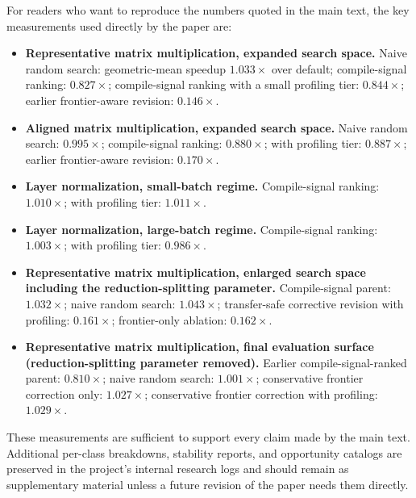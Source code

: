 For readers who want to reproduce the numbers quoted in the main text, the key measurements used directly by the paper are:
\begin{itemize}
\item \textbf{Representative matrix multiplication, expanded search space.} Naive random search: geometric-mean speedup $1.033\times$ over default; compile-signal ranking: $0.827\times$; compile-signal ranking with a small profiling tier: $0.844\times$; earlier frontier-aware revision: $0.146\times$.
\item \textbf{Aligned matrix multiplication, expanded search space.} Naive random search: $0.995\times$; compile-signal ranking: $0.880\times$; with profiling tier: $0.887\times$; earlier frontier-aware revision: $0.170\times$.
\item \textbf{Layer normalization, small-batch regime.} Compile-signal ranking: $1.010\times$; with profiling tier: $1.011\times$.
\item \textbf{Layer normalization, large-batch regime.} Compile-signal ranking: $1.003\times$; with profiling tier: $0.986\times$.
\item \textbf{Representative matrix multiplication, enlarged search space including the reduction-splitting parameter.} Compile-signal parent: $1.032\times$; naive random search: $1.043\times$; transfer-safe corrective revision with profiling: $0.161\times$; frontier-only ablation: $0.162\times$.
\item \textbf{Representative matrix multiplication, final evaluation surface (reduction-splitting parameter removed).} Earlier compile-signal-ranked parent: $0.810\times$; naive random search: $1.001\times$; conservative frontier correction only: $1.027\times$; conservative frontier correction with profiling: $1.029\times$.
\end{itemize}

These measurements are sufficient to support every claim made by the main text. Additional per-class breakdowns, stability reports, and opportunity catalogs are preserved in the project's internal research logs and should remain as supplementary material unless a future revision of the paper needs them directly.
